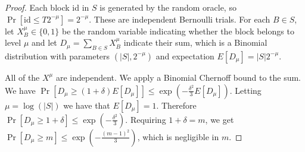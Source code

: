 \begin{proof}

    Each block id in $S$ is generated by the random oracle, so $\Pr[\text{id}
    \leq T 2^{-\mu}] = 2^{-\mu}$. These are independent Bernoulli trials. For
    each $B \in S$, let $X^{\mu}_B \in \{0, 1\}$ be the random variable
    indicating whether the block belongs to level $\mu$ and let $D_\mu = \sum_{B
    \in S} X^\mu_B$ indicate their sum, which is a Binomial distribution with
    parameters $(|S|, 2^{-\mu})$ and expectation $E[D_{\mu}] = |S| 2^{-\mu}$.

    All of the $X^{\mu}$ are independent. We apply a Binomial Chernoff
    bound to the sum. We have
    $\Pr[D_\mu \geq (1 + \delta)E[D_\mu]] \leq
    \exp(-\frac{\delta^2}{3}E[D_\mu])$. Letting $\mu = \log(|S|)$ we have that
    $E[D_\mu] = 1$. Therefore $\Pr[D_\mu \geq 1 + \delta] \leq
    \exp(-\frac{\delta^2}{3})$. Requiring $1 + \delta = m$, we get $\Pr[D_\mu
    \geq m] \leq \exp(-\frac{(m - 1)^2}{3})$, which is negligible in $m$.
    \Qed
\end{proof}
